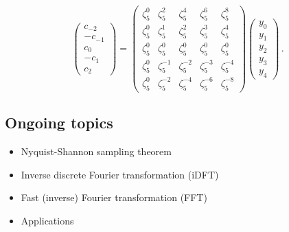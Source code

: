 \documentclass[a4paper, 10pt]{article}
\begin{document}
{\begin{equation*}
\left( \begin{array}{c}c_{-2}\\-c_{-1}\\c_0\\-c_1\\c_2\end{array} \right) = \left( \begin{array}{ccccc}
\zeta^0_5 & \zeta^2_5 & \zeta^4_5 & \zeta^6_5 &\zeta^8_5\\
\zeta^0_5 & \zeta^1_5 & \zeta^2_5 & \zeta^3_5 &\zeta^4_5\\
\zeta^0_5 & \zeta^0_5 & \zeta^0_5 & \zeta^0_5 &\zeta^0_5\\
\zeta^0_5 & \zeta^{-1}_5 & \zeta^{-2}_5 & \zeta^{-3}_5 &\zeta^{-4}_5\\
\zeta^0_5 & \zeta^{-2}_5 & \zeta^{-4}_5 & \zeta^{-6}_5 &\zeta^{-8}_5
\end{array}\right)
\left( \begin{array}{c}y_0 \\ y_1\\ y_2\\ y_3\\ y_4\end{array} \right)\,.
\end{equation*}

\subsection{Ongoing topics}
\begin{itemize}
\item Nyquist-Shannon sampling theorem
\item Inverse discrete Fourier transformation (iDFT)
\item Fast (inverse) Fourier transformation (FFT)
\item Applications
\end{itemize}

}
\end{document}
